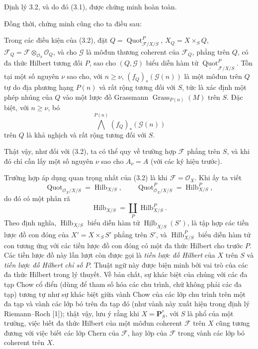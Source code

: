 Định lý 3.2, và do đó (3.1), được chứng minh hoàn toàn.

Đồng thời, chứng minh cũng cho ta điều sau:

 Trong các điều kiện của (3.2), đặt
$Q=\operatorname{Quot}^P_{\mathcal F/X/S}$, $X_Q=X\times_SQ$,
$\mathcal F_Q=\mathcal F\otimes_{\mathcal O_S}\mathcal O_Q$, và cho
$\mathcal G$ là môđun thương coherent của $\mathcal F_Q$, phẳng trên $Q$, có
đa thức Hilbert tương đối $P$, sao cho $(Q,\mathcal G)$ biểu diễn hàm tử
$\underline{\operatorname{Quot}}^P_{\mathcal F/X/S}$. Tồn tại một số nguyên
$\nu$ sao cho, với $n\geq\nu$, $(f_Q)_*(\mathcal G(n))$ là một môđun trên $Q$
tự do địa phương hạng $P(n)$ và rất rộng tương đối với $S$, tức là xác định
một phép nhúng của $Q$ vào một lược đồ Grassmann
$\operatorname{Grass}_{P(n)}(M)$ trên $S$. Đặc biệt, với $n\geq\nu$, bó
\[
\bigwedge^{P(n)}(f_Q)_*(\mathcal G(n))
\]
trên $Q$ là khả nghịch và rất rộng tương đối với $S$.

Thật vậy, như đối với (3.2), ta có thể quy về trường hợp $\mathcal F$ phẳng
trên $S$, và khi đó chỉ cần lấy một số nguyên $\nu$ sao cho $A_\nu=A$ (với các
ký hiệu trước).

Trường hợp áp dụng quan trọng nhất của (3.2) là khi
$\mathcal F=\mathcal O_X$. Khi ấy ta viết
\[
\operatorname{Quot}_{\mathcal O_X/X/S}=\operatorname{Hilb}_{X/S},
\qquad
\operatorname{Quot}^P_{\mathcal O_X/X/S}=\operatorname{Hilb}^P_{X/S},
\]
do đó có một phân rã
\[
\operatorname{Hilb}_{X/S}=\coprod_P\operatorname{Hilb}^P_{X/S}.
\]
Theo định nghĩa, $\operatorname{Hilb}_{X/S}$ biểu diễn hàm tử
$\underline{\operatorname{Hilb}}_{X/S}(S')$, là tập hợp các tiền lược đồ con
đóng của $X'=X\times_SS'$ phẳng trên $S'$, và
$\operatorname{Hilb}^P_{X/S}$ biểu diễn hàm tử con tương ứng với các tiền lược
đồ con đóng có một đa thức Hilbert cho trước $P$. Các tiền lược đồ này lần lượt
còn được gọi là \emph{tiền lược đồ Hilbert} của $X$ trên $S$ và
\emph{tiền lược đồ Hilbert chỉ số $P$}. Thuật ngữ này được biện minh bởi vai
trò của các đa thức Hilbert trong lý thuyết. Về bản chất, sự khác biệt của
chúng với các đa tạp Chow cổ điển (dùng để tham số hóa các chu trình, chứ không
phải các đa tạp) tương tự như sự khác biệt giữa
vành Chow của các lớp chu trình trên một đa tạp và vành các lớp bó trên đa
tạp đó (như vành này xuất hiện trong định lý Riemann--Roch [1]); thật vậy,
lưu ý rằng khi $X=\mathbf P^r_S$, với $S$ là phổ của một trường, việc biết đa
thức Hilbert của một môđun coherent $\mathcal F$ trên $X$ cũng tương đương với
việc biết các lớp Chern của $\mathcal F$, hay lớp của $\mathcal F$ trong vành
các lớp bó coherent trên $X$.

